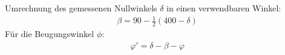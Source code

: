 Umrechnung des gemessenen Nullwinkels $\delta$ in einen verwendbaren Winkel:
\begin{align}\label{Beta}
	\beta = 90 - \frac{1}{2}(400-\delta)
\end{align}
Für die Beugungswinkel $\phi$:
\begin{align}\label{Beugungswinkel}
	\varphi' = \delta - \beta - \varphi
\end{align}
